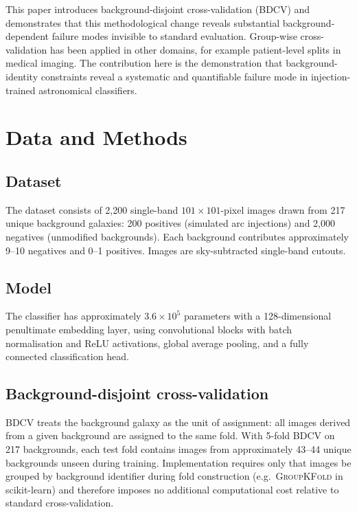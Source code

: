 \documentclass[fleqn,usenatbib]{mnras}
\begin{document}
This paper introduces background-disjoint cross-validation (BDCV) and
demonstrates that this methodological change reveals substantial
background-dependent failure modes invisible to standard evaluation.
Group-wise cross-validation has been applied in other domains, for
example patient-level splits in medical imaging. The contribution here
is the demonstration that background-identity constraints reveal a
systematic and quantifiable failure mode in injection-trained
astronomical classifiers.

\section{Data and Methods}
\label{sec:methods}

\subsection{Dataset}
\label{sec:dataset}

The dataset consists of 2,200 single-band $101\times101$-pixel images
drawn from 217 unique background galaxies: 200 positives (simulated arc
injections) and 2,000 negatives (unmodified backgrounds). Each background
contributes approximately 9--10 negatives and 0--1 positives. Images are
sky-subtracted single-band cutouts.

\subsection{Model}
\label{sec:model}

The classifier has approximately $3.6\times10^5$ parameters with a
128-dimensional penultimate embedding layer, using convolutional blocks
with batch normalisation and ReLU activations, global average pooling,
and a fully connected classification head.

\subsection{Background-disjoint cross-validation}
\label{sec:bdcv}

BDCV treats the background galaxy as the unit of assignment: all images
derived from a given background are assigned to the same fold. With
5-fold BDCV on 217 backgrounds, each test fold contains images from
approximately 43--44 unique backgrounds unseen during training.
Implementation requires only that images be grouped by background
identifier during fold construction (e.g.\ \textsc{GroupKFold} in
scikit-learn) and therefore imposes no additional computational cost
relative to standard cross-validation.
\end{document}
